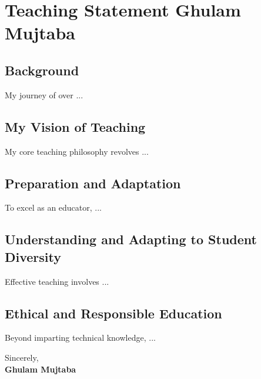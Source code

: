 
\vspace{1.0cm}

\section*{\centering Teaching Statement \hfill Ghulam Mujtaba \hfill\hspace*{\fill}\monthYear}

\vspace*{5pt}

\subsection{Background}
My journey of over ...





\vspace*{5pt}

\subsection{My Vision of Teaching}
My core teaching philosophy revolves ...




\vspace*{5pt}

\subsection{Preparation and Adaptation}
To excel as an educator, ...

\vspace*{5pt}

\subsection{Understanding and Adapting to Student Diversity}
Effective teaching involves ...


\vspace*{5pt}

\subsection{Ethical and Responsible Education}
Beyond imparting technical knowledge, ...



\vspace*{25pt}


Sincerely,\\
\textbf{Ghulam Mujtaba}
